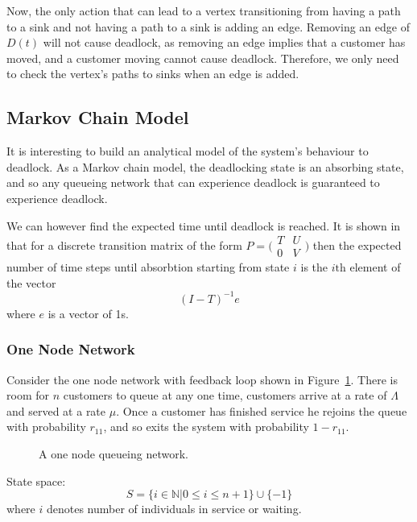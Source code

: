 \documentclass{article}
\begin{document}
Now, the only action that can lead to a vertex transitioning from having a path to a sink and not having a path to a sink is adding an edge.
Removing an edge of $D(t)$ will not cause deadlock, as removing an edge implies that a customer has moved, and a customer moving cannot cause deadlock.
Therefore, we only need to check the vertex's paths to sinks when an edge is added.

\subsection{Markov Chain Model}

It is interesting to build an analytical model of the system's behaviour to deadlock.
As a Markov chain model, the deadlocking state is an absorbing state, and so any queueing network that can experience deadlock is guaranteed to experience deadlock.

We can however find the expected time until deadlock is reached.
It is shown in \cite{stewart09} that for a discrete transition matrix of the form $P = \bigl(\begin{smallmatrix} T & U\\ 0 & V \end{smallmatrix} \bigr)$ then the expected number of time steps until absorbtion starting from state $i$ is the $i\text{th}$ element of the vector
\begin{equation}
  (I - T)^{-1}e
\end{equation}
where $e$ is a vector of 1s.

\subsubsection{One Node Network}
Consider the one node network with feedback loop shown in Figure~\ref{fig:queueingnetwork_1node}.
There is room for $n$ customers to queue at any one time, customers arrive at a rate of $\Lambda$ and served at a rate $\mu$.
Once a customer has finished service he rejoins the queue with probability $r_{11}$, and so exits the system with probability $1 - r_{11}$.

\begin{figure}[H]
  
  \caption{A one node queueing network.}
  \label{fig:queueingnetwork_1node}
\end{figure}

State space:
        \[S = \{i\in\mathbb{N}| 0 \leq i \leq n + 1
        \}\cup\{-1\}\]
where \(i\) denotes number of individuals in service or waiting.
\end{document}
